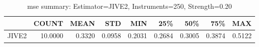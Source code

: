 \begin{table}[ht]
\centering
\caption{mse summary: Estimator=JIVE2, Instruments=250, Strength=0.20}
\begin{tabular}{lrrrrrrrr}
\toprule
 & COUNT & MEAN & STD & MIN & 25\% & 50\% & 75\% & MAX \\
\midrule
JIVE2 & 10.0000 & 0.3320 & 0.0958 & 0.2031 & 0.2684 & 0.3005 & 0.3874 & 0.5122 \\
\bottomrule
\end{tabular}
\end{table}
